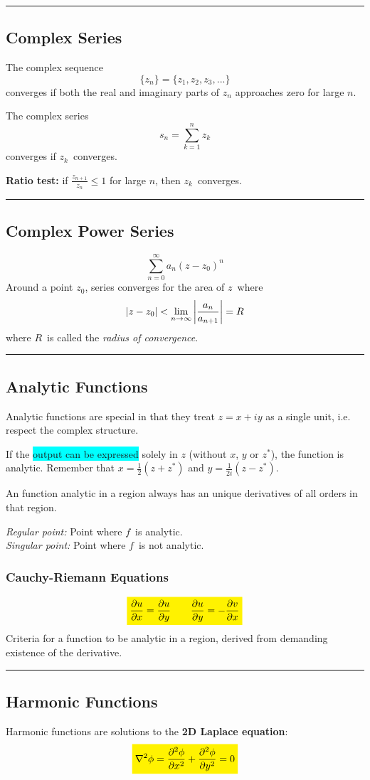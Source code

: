 \documentclass[10pt,a4paper]{article}
\newcommand{\holine}{\rule{286pt}{1pt}}
\newcommand{\half}{\frac{1}{2}}
\newcommand{\yl}[1]{\colorbox{yellow}{$\displaystyle #1$}}
\newcommand{\bll}{\colorbox{cyan}}
\begin{document}
\begin{multicols}{2}
\holine
\subsection*{Complex Series}
The complex sequence
\[
    \{z_n\} = \{z_1, z_2, z_3, ...\}
\]
converges if both the real and imaginary parts of $z_n$ approaches zero for large $n$.

The complex series
\[
    s_n = \sum_{k=1}^n z_k
\]
converges if $z_k$ converges.

\textbf{Ratio test:}
if $\frac{z_{n+1}}{z_n} \leq 1$ for large $n$, then $z_k$ converges.


\holine
\subsection*{Complex Power Series}
\[
    \sum_{n=0}^\infty a_n(z-z_0)^n
\]
Around a point $z_0$, series converges for the area of $z$ where
\[
    |z-z_0| < \lim_{n\rightarrow\infty} \qty|\frac{a_n}{a_{n+1}}| = R
\]
where $R$ is called the \textit{radius of convergence}.


\holine
\subsection*{Analytic Functions}
Analytic functions are special in that they treat $z=x+iy$ as a single unit, i.e. respect the complex structure.

If the \bll{output can be expressed} solely in $z$ (without $x$, $y$ or $z^*$), the function is analytic. Remember that $x = \half (z+z^*)$ and $y=\frac{1}{2i}(z-z^*)$.

An function analytic in a region always has an unique derivatives of all orders in that region.


\textit{Regular point:} Point where $f$ is analytic.\\
\textit{Singular point:} Point where $f$ is not analytic.


\subsubsection*{Cauchy-Riemann Equations}
\[\yl{
    \pdv{u}{x} = \pdv{u}{y} \quad\quad \pdv{u}{y} = - \pdv{v}{x}
}\]
Criteria for a function to be analytic in a region, derived from demanding existence of the derivative.



\holine
\subsection*{Harmonic Functions}
Harmonic functions are solutions to the \textbf{2D Laplace equation}:
\[\yl{
    \nabla^2 \phi = \pdv[2]{\phi}{x} + \pdv[2]{\phi}{y} = 0
}\]


\end{multicols}
\end{document}
